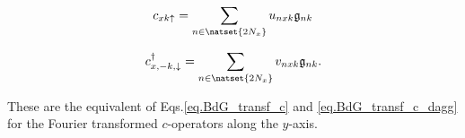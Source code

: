 \documentclass[../main.tex]{subfile}
\begin{document}
\begin{center}
    \begin{minipage}{0.4\textwidth}
    \begin{equation}\label{eq:BdG_transf_c_fourier}
        c_{xk\uparrow} = \sum_{n\in\natset{2N_x}} u_{nxk}\mathfrak{g}_{nk} 
    \end{equation}
    \end{minipage}\hspace{0.05\textwidth}
    \begin{minipage}{0.03\textwidth}
    \end{minipage}
    \begin{minipage}{0.45\textwidth}
        \begin{equation}
        \label{eq:BdG_transf_c_fourier_dagg}
            c_{x,-k,\downarrow}^{\dagger} =\sum_{n\in\natset{2N_x}} v_{nxk}\mathfrak{g}_{nk}. 
        \end{equation}
    \end{minipage}
    \end{center}
These are the equivalent of Eqs.\ref{eq.BdG_transf_c} and \ref{eq.BdG_transf_c_dagg} for the Fourier transformed $c$-operators along the $y$-axis.\\
\end{document}
